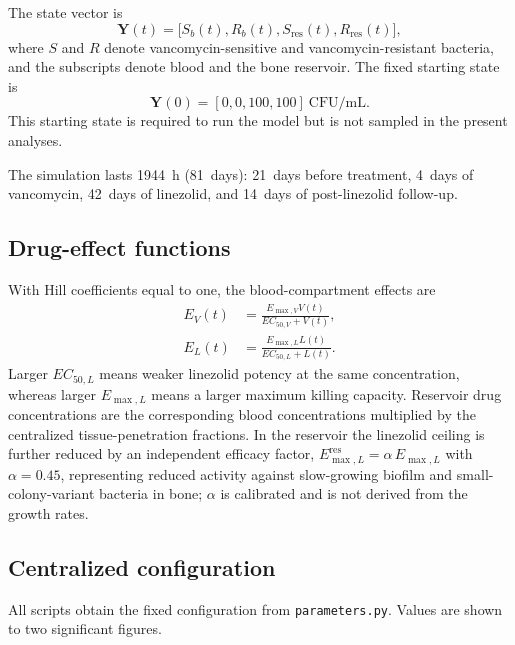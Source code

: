 \documentclass[11pt]{article}
\newcommand{\EC}{EC_{50,L}}
\newcommand{\EM}{E_{\max,L}}
\begin{document}
The state vector is
\begin{equation}
\mathbf{Y}(t)=\bigl[S_b(t),R_b(t),S_{\mathrm{res}}(t),R_{\mathrm{res}}(t)\bigr],
\end{equation}
where $S$ and $R$ denote vancomycin-sensitive and vancomycin-resistant
bacteria, and the subscripts denote blood and the bone reservoir. The fixed
starting state is
\begin{equation}
\mathbf{Y}(0)=[0,0,100,100]\ \mathrm{CFU/mL}.
\end{equation}
This starting state is required to run the model but is not sampled in the
present analyses.

The simulation lasts 1944~h (81~days): 21~days before treatment, 4~days of
vancomycin, 42~days of linezolid, and 14~days of post-linezolid follow-up.

\subsection{Drug-effect functions}

With Hill coefficients equal to one, the blood-compartment effects are
\begin{align}
E_V(t)&=\frac{E_{\max,V}V(t)}{EC_{50,V}+V(t)},\\
E_L(t)&=\frac{\EM L(t)}{\EC+L(t)}.
\end{align}
Larger $\EC$ means weaker linezolid potency at the same concentration,
whereas larger $\EM$ means a larger maximum killing capacity. Reservoir drug
concentrations are the corresponding blood concentrations multiplied by the
centralized tissue-penetration fractions. In the reservoir the linezolid
ceiling is further reduced by an independent efficacy factor,
$E_{\max,L}^{\mathrm{res}}=\alpha\,\EM$ with $\alpha=0.45$, representing
reduced activity against slow-growing biofilm and small-colony-variant
bacteria in bone; $\alpha$ is calibrated and is not derived from the growth
rates.

\subsection{Centralized configuration}

All scripts obtain the fixed configuration from \texttt{parameters.py}.
Values are shown to two significant figures.
\end{document}
